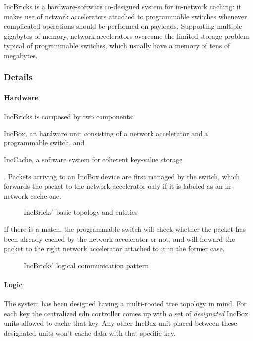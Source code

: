 IncBricks \cite{incbricks} is a hardware-software co-designed system for in-network caching: it makes use of network accelerators attached to programmable switches whenever complicated operations should be performed on payloads.
Supporting multiple gigabytes of memory, network accelerators overcome the limited storage problem typical of programmable switches, which usually have a memory of tens of megabytes.

\subsubsection{Details}
\paragraph{Hardware}
IncBricks \cite{incbricks} is composed by two components:
\begin{mylist}
    \item IncBox, an hardware unit consisting of a network accelerator and a programmable switch, and
    \item IncCache, a software system for coherent key-value storage
\end{mylist}.
Packets arriving to an IncBox device are first managed by the switch, which forwards the packet to the network accelerator only if it is labeled as an in-network cache one.

\begin{figure}[!htb]
    \centering
    \usebox{\incbricksbasic}
    \caption{IncBricks' \texorpdfstring{\cite{incbricks}}{} basic topology and entities}
\end{figure}

If there is a match, the programmable switch will check whether the packet has been already cached by the network accelerator or not, and will forward the packet to the right network accelerator attached to it in the former case.

\begin{figure}[!htb]
    \centering
    \usebox{\incbrickscommunication}
    \caption{IncBricks' \texorpdfstring{\cite{incbricks}}{} logical communication pattern}
\end{figure}

\paragraph{Logic}
The system has been designed having a multi-rooted tree topology in mind.
For each key the centralized \gls{sdn} controller comes up with a set of \textit{designated} IncBox units allowed to cache that key.
Any other IncBox unit placed between these designated units won't cache data with that specific key.

